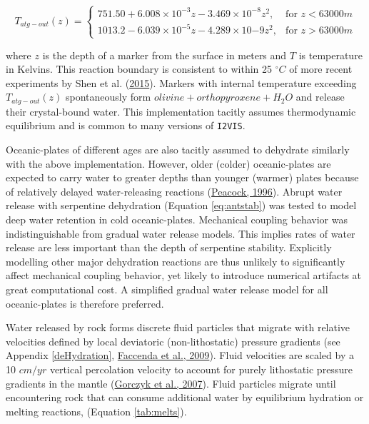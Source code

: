 \begin{equation}
  T_{atg-out}(z)=
  \begin{cases}
    751.50+6.008\times10^{-3}z-3.469\times10^{-8}z^2,& \text{for } z < 63000m \\
    1013.2-6.039\times10^{-5}z-4.289\times10{-9}z^2,& \text{for } z>63000m
  \end{cases}
  \label{eq:antstab}
\end{equation}

where \(z\) is the depth of a marker from the surface in meters and \(T\) is temperature in Kelvins. This reaction boundary is consistent to within 25 \(^{\circ}C\) of more recent experiments by Shen et al. (\protect\hyperlink{ref-shen2015}{2015}). Markers with internal temperature exceeding \(T_{atg-out}(z)\) spontaneously form \(olivine + orthopyroxene + H_{2}O\) and release their crystal-bound water. This implementation tacitly assumes thermodynamic equilibrium and is common to many versions of \texttt{I2VIS}.

Oceanic-plates of different ages are also tacitly assumed to dehydrate similarly with the above implementation. However, older (colder) oceanic-plates are expected to carry water to greater depths than younger (warmer) plates because of relatively delayed water-releasing reactions (\protect\hyperlink{ref-peacock1996}{Peacock, 1996}). Abrupt water release with serpentine dehydration (Equation \eqref{eq:antstab}) was tested to model deep water retention in cold oceanic-plates. Mechanical coupling behavior was indistinguishable from gradual water release models. This implies rates of water release are less important than the depth of serpentine stability. Explicitly modelling other major dehydration reactions are thus unlikely to significantly affect mechanical coupling behavior, yet likely to introduce numerical artifacts at great computational cost. A simplified gradual water release model for all oceanic-plates is therefore preferred.

Water released by rock forms discrete fluid particles that migrate with relative velocities defined by local deviatoric (non-lithostatic) pressure gradients (see Appendix \ref{deHydration}, \protect\hyperlink{ref-faccenda2009}{Faccenda et al., 2009}). Fluid velocities are scaled by a 10 \(cm/yr\) vertical percolation velocity to account for purely lithostatic pressure gradients in the mantle (\protect\hyperlink{ref-gorczyk2007}{Gorczyk et al., 2007}). Fluid particles migrate until encountering rock that can consume additional water by equilibrium hydration or melting reactions, (Equation \ref{tab:melts}).

